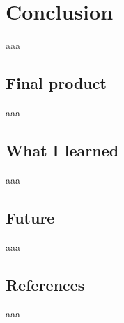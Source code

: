 \documentclass[12pt]{report}
\begin{document}
    \part{Conclusion}
        aaa

        \chapter{Final product}
            aaa

        \chapter{What I learned}
            aaa

        \chapter{Future}
            aaa

        \chapter{References}
            aaa
\end{document}
